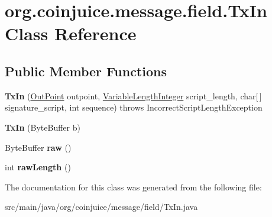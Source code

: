 \hypertarget{classorg_1_1coinjuice_1_1message_1_1field_1_1_tx_in}{\section{org.\-coinjuice.\-message.\-field.\-Tx\-In Class Reference}
\label{classorg_1_1coinjuice_1_1message_1_1field_1_1_tx_in}
}
\subsection*{Public Member Functions}
\begin{DoxyCompactItemize}
\item 
\hypertarget{classorg_1_1coinjuice_1_1message_1_1field_1_1_tx_in_ac6e0ba76e496ccf19fdaba2e2becf4d0}{{\bfseries Tx\-In} (\hyperlink{classorg_1_1coinjuice_1_1message_1_1field_1_1_out_point}{Out\-Point} outpoint, \hyperlink{classorg_1_1coinjuice_1_1message_1_1field_1_1_variable_length_integer}{Variable\-Length\-Integer} script\-\_\-length, char\mbox{[}$\,$\mbox{]} signature\-\_\-script, int sequence)  throws Incorrect\-Script\-Length\-Exception }\label{classorg_1_1coinjuice_1_1message_1_1field_1_1_tx_in_ac6e0ba76e496ccf19fdaba2e2becf4d0}

\item 
\hypertarget{classorg_1_1coinjuice_1_1message_1_1field_1_1_tx_in_a3ec90660b6ef6503984e1d07cd8a3bd8}{{\bfseries Tx\-In} (Byte\-Buffer b)}\label{classorg_1_1coinjuice_1_1message_1_1field_1_1_tx_in_a3ec90660b6ef6503984e1d07cd8a3bd8}

\item 
\hypertarget{classorg_1_1coinjuice_1_1message_1_1field_1_1_tx_in_aa21dd0b62ee7eea20fbcf5fdeb2cf4e9}{Byte\-Buffer {\bfseries raw} ()}\label{classorg_1_1coinjuice_1_1message_1_1field_1_1_tx_in_aa21dd0b62ee7eea20fbcf5fdeb2cf4e9}

\item 
\hypertarget{classorg_1_1coinjuice_1_1message_1_1field_1_1_tx_in_a64ac9d5f88c22ae593041385001e4f68}{int {\bfseries raw\-Length} ()}\label{classorg_1_1coinjuice_1_1message_1_1field_1_1_tx_in_a64ac9d5f88c22ae593041385001e4f68}

\end{DoxyCompactItemize}


The documentation for this class was generated from the following file\-:\begin{DoxyCompactItemize}
\item 
src/main/java/org/coinjuice/message/field/Tx\-In.\-java\end{DoxyCompactItemize}
